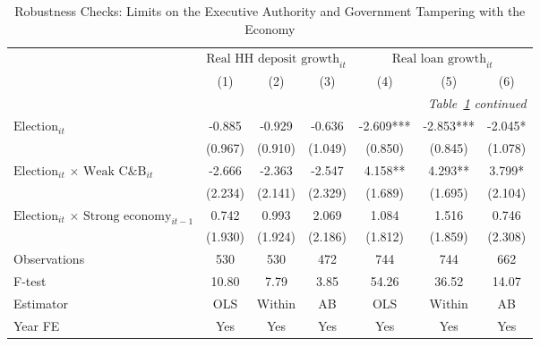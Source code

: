 \begin{longtable}{m{4.5cm}*{6}{c}}                                         \caption{Robustness Checks: Limits on the Executive Authority and Government Tampering with the Economy\label{govtempcb}}\\                                         \toprule                                         &\multicolumn{3}{c}{$\text{Real HH deposit growth}_{it}$} & \multicolumn{3}{c}{$\text{Real loan growth}_{it}$} \\ \cmidrule(lr){2-4} \cmidrule(lr){5-7}
                    &         (1)   &         (2)   &         (3)   &         (4)   &         (5)   &         (6)   \\
\midrule\endfirsthead                                         \multicolumn{7}{r}{\textit{Table~\ref{govtempcb} continued}} \\                                         \toprule\endhead\midrule\endfoot\endlastfoot
$\text{Election}_{it}$&      -0.885   &      -0.929   &      -0.636   &      -2.609***&      -2.853***&      -2.045*  \\
                    &     (0.967)   &     (0.910)   &     (1.049)   &     (0.850)   &     (0.845)   &     (1.078)   \\
\multirow{2}{4.5cm}{$\text{Election}_{it}$ $\times$ $\text{Weak C\&B}_{it}$}&      -2.666   &      -2.363   &      -2.547   &       4.158** &       4.293** &       3.799*  \\
                    &     (2.234)   &     (2.141)   &     (2.329)   &     (1.689)   &     (1.695)   &     (2.104)   \\
\multirow{2}{4.5cm}{$\text{Election}_{it}$ $\times$ $\text{Strong economy}_{it-1}$}&       0.742   &       0.993   &       2.069   &       1.084   &       1.516   &       0.746   \\
                    &     (1.930)   &     (1.924)   &     (2.186)   &     (1.812)   &     (1.859)   &     (2.308)   \\
\midrule
Observations        &         530   &         530   &         472   &         744   &         744   &         662   \\
F-test              &       10.80   &        7.79   &        3.85   &       54.26   &       36.52   &       14.07   \\
Estimator           &         OLS   &      Within   &          AB   &         OLS   &      Within   &          AB   \\
Year FE             &         Yes   &         Yes   &         Yes   &         Yes   &         Yes   &         Yes   \\

\end{longtable}
